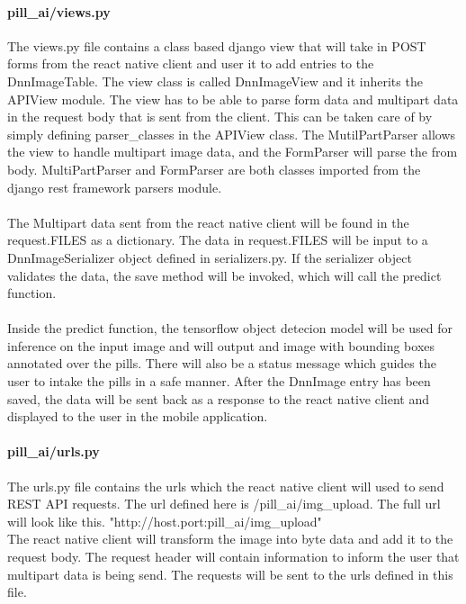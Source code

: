 \documentclass[conference]{IEEEtran}
\begin{document}
\paragraph{pill\_ai/views.py}
The views.py file contains a class based django view that will take in POST forms from the react native client and user it to add entries to the DnnImageTable. The view class is called DnnImageView and it inherits the APIView module. The view has to be able to parse form data and multipart data in the request body that is sent from the client. This can be taken care of by simply defining parser\_classes in the APIView class. The MutilPartParser allows the view to handle multipart image data, and the FormParser will parse the from body. MultiPartParser and FormParser are both classes imported from the django rest framework parsers module. \\ \\
The Multipart data sent from the react native client will be found in the request.FILES as a dictionary. The data in request.FILES will be input to a DnnImageSerializer object defined in serializers.py. If the serializer object validates the data, the save method will be invoked, which will call the predict function. \\ \\
Inside the predict function, the tensorflow object detecion model will be used for inference on the input image and will output and image with bounding boxes annotated over the pills. There will also be a status message which guides the user to intake the pills in a safe manner. After the DnnImage entry has been saved, the data will be sent back as a response to the react native client and displayed to the user in the mobile application.\\

\paragraph{pill\_ai/urls.py}
The urls.py file contains the urls which the react native client will used to send REST API requests. The url defined here is /pill\_ai/img\_upload. The full url will look like this. "http://host.port:pill\_ai/img\_upload" \\
The react native client will transform the image into byte data and add it to the request body. The request header will contain information to inform the user that multipart data is being send. The requests will be sent to the urls defined in this file.
\end{document}
